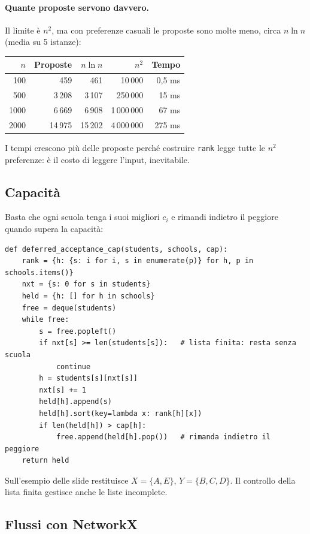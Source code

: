 \paragraph{Quante proposte servono davvero.} Il limite è $n^2$, ma con preferenze casuali
le proposte sono molte meno, circa $n \ln n$ (media su 5 istanze):
\begin{center}
\renewcommand{\arraystretch}{1.2}
\begin{tabular}{rrrrr}
\toprule
$n$ & Proposte & $n \ln n$ & $n^2$ & Tempo \\
\midrule
100  & 459     & 461     & 10\,000     & 0,5 ms \\
500  & 3\,208  & 3\,107  & 250\,000    & 15 ms \\
1000 & 6\,669  & 6\,908  & 1\,000\,000 & 67 ms \\
2000 & 14\,975 & 15\,202 & 4\,000\,000 & 275 ms \\
\bottomrule
\end{tabular}
\end{center}
I tempi crescono più delle proposte perché costruire \texttt{rank} legge tutte le $n^2$
preferenze: è il costo di leggere l'input, inevitabile.

\subsection{Capacità}

Basta che ogni scuola tenga i suoi migliori $c_i$ e rimandi indietro il peggiore quando
supera la capacità:
\begin{lstlisting}
def deferred_acceptance_cap(students, schools, cap):
    rank = {h: {s: i for i, s in enumerate(p)} for h, p in schools.items()}
    nxt = {s: 0 for s in students}
    held = {h: [] for h in schools}
    free = deque(students)
    while free:
        s = free.popleft()
        if nxt[s] >= len(students[s]):   # lista finita: resta senza scuola
            continue
        h = students[s][nxt[s]]
        nxt[s] += 1
        held[h].append(s)
        held[h].sort(key=lambda x: rank[h][x])
        if len(held[h]) > cap[h]:
            free.append(held[h].pop())   # rimanda indietro il peggiore
    return held
\end{lstlisting}
Sull'esempio delle slide restituisce $X = \{A, E\}$, $Y = \{B, C, D\}$. Il controllo della
lista finita gestisce anche le liste incomplete.

\subsection{Flussi con NetworkX}

